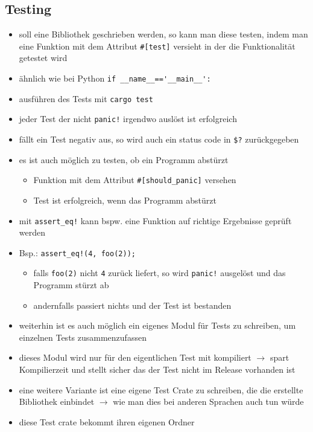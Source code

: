 \documentclass[a4paper,12pt]{article}
\begin{document}
\newpage
\subsection{Testing}
	\begin{itemize}
	  \item soll eine Bibliothek geschrieben werden, so kann man diese testen, indem man eine Funktion mit dem Attribut \verb|#[test]| versieht in der die Funktionalität getestet wird
	  \item ähnlich wie bei Python \verb|if __name__=='__main__':|
	  \item ausführen des Tests mit \verb|cargo test|
	  \item jeder Test der nicht \verb|panic!| irgendwo auslöst ist erfolgreich
	  \item fällt ein Test negativ aus, so wird auch ein status code in \verb|$?| zurückgegeben
	  \item es ist auch möglich zu testen, ob ein Programm abstürzt
	  	\begin{itemize}
	  	  \item Funktion mit dem Attribut \verb|#[should_panic]| versehen
	  	  \item Test ist erfolgreich, wenn das Programm abstürzt
	  	\end{itemize}
	 \item mit \verb|assert_eq!| kann bspw. eine Funktion auf richtige Ergebnisse geprüft werden 
	 \item Bsp.:  \verb|assert_eq!(4, foo(2));|
	 	\begin{itemize}
	 	  \item falls \verb|foo(2)| nicht \verb|4| zurück liefert, so wird \verb|panic!| ausgelöst und das Programm stürzt ab
	 	  \item andernfalls passiert nichts und der Test ist bestanden
	 	\end{itemize}
	 \item weiterhin ist es auch möglich ein eigenes Modul für Tests zu schreiben, um einzelnen Tests zusammenzufassen 
	 \item dieses Modul wird nur für den eigentlichen Test mit kompiliert $\rightarrow$ spart Kompilierzeit  und stellt sicher das der Test nicht im Release vorhanden ist
	 \item eine weitere Variante ist eine eigene Test Crate zu schreiben, die die erstellte Bibliothek einbindet $\rightarrow$ wie man dies bei anderen Sprachen auch tun würde
	 \item diese Test crate bekommt ihren eigenen Ordner
	\end{itemize}
\end{document}
